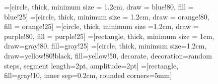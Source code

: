 \documentclass[12pt, a4paper]{article}
\begin{document}
\begin{figure}[h]
\centering

=[circle, thick, minimum size = 1.2cm, draw = blue!80, fill = blue!25]
=[circle, thick, minimum size = 1.2cm, draw = orange!80, fill = orange!25]			
=[circle, thick, minimum size =1.2cm, draw = purple!80, fill = purple!25]
=[rectangle, thick, minimum size = 1cm, draw=gray!80, fill=gray!25]
=[circle, thick, minimum size=1.2cm, draw=yellow!80!black, fill=yellow!50, decorate, decoration={random steps, segment length=2pt, amplitude=2pt}]
=[rectangle, fill=gray!10, inner sep=0.2cm, rounded corners=5mm]



\end{figure}
\end{document}
